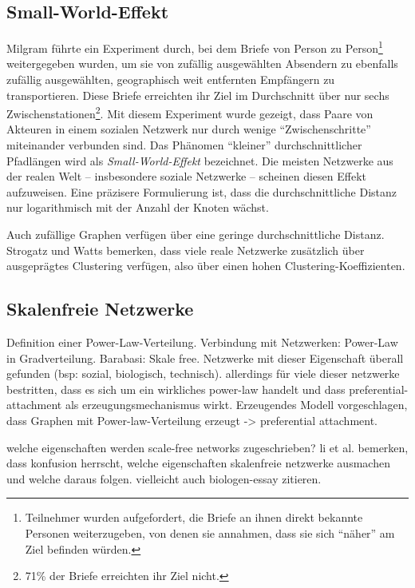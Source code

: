 \subsection{Small-World-Effekt}
\label{sec:small-world-effekt}

Milgram führte ein Experiment durch, bei dem Briefe von Person zu
Person\footnote{Teilnehmer wurden aufgefordert, die Briefe an ihnen
  direkt bekannte Personen weiterzugeben, von denen sie annahmen, dass
  sie sich ``näher'' am Ziel befinden würden.} weitergegeben
wurden, um sie von zufällig ausgewählten Absendern zu ebenfalls
zufällig ausgewählten, geographisch weit entfernten Empfängern
zu transportieren\cite{Travers1969}. Diese Briefe erreichten ihr Ziel
im Durchschnitt über nur sechs Zwischenstationen\footnote{71\% der
  Briefe erreichten ihr Ziel nicht.}. Mit diesem Experiment wurde
gezeigt, dass Paare von Akteuren in einem sozialen Netzwerk nur durch
wenige ``Zwischenschritte'' miteinander verbunden sind. Das Phänomen
``kleiner'' durchschnittlicher Pfadlängen wird als
\emph{Small-World-Effekt} bezeichnet. Die meisten Netzwerke aus der
realen Welt -- insbesondere soziale Netzwerke -- scheinen diesen
Effekt aufzuweisen\cite{newman:167}. Eine präzisere Formulierung
ist, dass die durchschnittliche Distanz nur logarithmisch mit der
Anzahl der Knoten wächst.

Auch zufällige Graphen verfügen über eine geringe
durchschnittliche Distanz. Strogatz und Watts bemerken, dass viele
reale Netzwerke zusätzlich über ausgeprägtes Clustering
verfügen, also über einen hohen
Clustering-Koeffizienten\cite{Watts1998}.

\subsection{Skalenfreie Netzwerke}
\label{sec:skal-netzw}

Definition einer Power-Law-Verteilung. Verbindung mit Netzwerken:
Power-Law in Gradverteilung. Barabasi: Skale free. Netzwerke mit
dieser Eigenschaft überall gefunden (bsp: sozial, biologisch,
technisch). allerdings für viele dieser netzwerke bestritten, dass
es sich um ein wirkliches power-law handelt und dass
preferential-attachment als erzeugungsmechanismus wirkt. Erzeugendes
Modell vorgeschlagen, dass Graphen mit Power-law-Verteilung erzeugt ->
preferential attachment.

welche eigenschaften werden scale-free networks zugeschrieben? li et
al. bemerken, dass konfusion herrscht, welche eigenschaften
skalenfreie netzwerke ausmachen und welche daraus folgen. vielleicht
auch biologen-essay zitieren.

